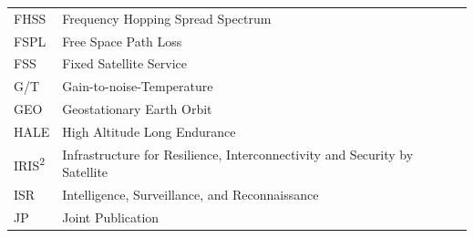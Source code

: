 \documentclass[english, 12pt, a4paper, elec, utf8, a-1b, online]{aaltothesis}
\begin{document}
\begin{tabular}{ll}
FHSS                    & Frequency Hopping Spread Spectrum \\
FSPL                    & Free Space Path Loss \\
FSS                     & Fixed Satellite Service \\
G/T                     & Gain-to-noise-Temperature \\
GEO                     & Geostationary Earth Orbit \\
HALE                    & High Altitude Long Endurance \\
IRIS\textsuperscript{2} & Infrastructure for Resilience, Interconnectivity and Security by Satellite \\
ISR                     & Intelligence, Surveillance, and Reconnaissance \\
JP                      & Joint Publication \\
\end{tabular}

\pagebreak
\end{document}
